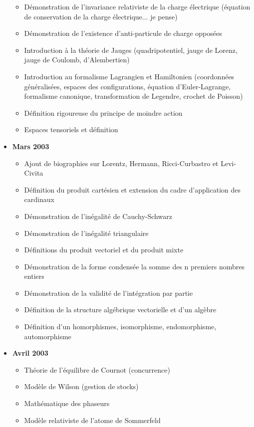 \documentclass[12pt,a4paper,twoside,openright]{report}
\theoremstyle{definition}
\theoremstyle{itexmp}
\numberwithin{equation}{section}
\begin{document}
\begin{itemize}
\begin{itemize}[noitemsep]
				\item Démonstration de l'invariance relativiste de la charge électrique (équation de conservation de la charge électrique... je pense)
				\item Démonstration de l'existence d'anti-particule de charge opposées
				\item Introduction à la théorie de Jauges (quadripotentiel, jauge de Lorenz, jauge de Coulomb, d'Alembertien)
				\item Introduction au formalisme Lagrangien et Hamiltonien (coordonnées généralisées, espaces des configurations, équation d'Euler-Lagrange, formalisme canonique, transformation de Legendre, crochet de Poisson)
				\item Définition rigoureuse du principe de moindre action
				\item Espaces tensoriels et définition
				\end{itemize}
		\item \textbf{Mars 2003}
			\begin{itemize}[noitemsep]
				\item Ajout de biographies sur Lorentz, Hermann, Ricci-Curbastro et Levi-Civita
				\item Définition du produit cartésien et extension du cadre d'application des cardinaux
				\item Démonstration de l'inégalité de Cauchy-Schwarz
				\item Démonstration de l'inégalité triangulaire
				\item Définitions du produit vectoriel et du produit mixte
				\item Démonstration de la forme condensée la somme des n premiers nombres entiers
				\item Démonstration de la validité de l'intégration par partie
				\item Définition de la structure algébrique vectorielle et d'un algèbre
				\item Définition d'un homorphismes, isomorphisme, endomorphisme, automorphisme
			\end{itemize}
		\item \textbf{Avril 2003}
			\begin{itemize}[noitemsep]
				\item Théorie de l'équilibre de Cournot (concurrence)
				\item Modèle de Wilson (gestion de stocks)
				\item Mathématique des phaseurs
				\item Modèle relativiste de l'atome de Sommerfeld

\end{itemize}
\end{itemize}
\end{document}
